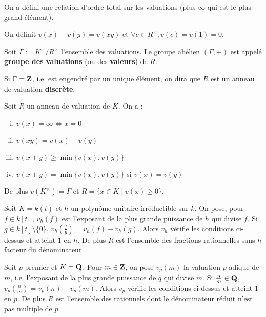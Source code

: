	\begin{rem}
		On a défini une relation d'ordre total sur les valuations (plus $\infty$ qui est le plus grand élément).
	\end{rem}

	\begin{note}
		On définit $v(x) + v(y) = v(xy)$ et $\forall c \in R^\times, v(c) = v(1) = 0$.
	\end{note}

	\begin{defn}
		Soit $\Gamma := K^\times / R^\times$ l'ensemble des valuations.
		Le groupe abélien $(\Gamma, +)$ est appelé \textbf{groupe des valuations} (ou des \textbf{valeurs}) de $R$.
	\end{defn}

	\begin{defn}
		Si $\Gamma = \mathbf{Z}$, i.e. est engendré par un unique élément, on dira que $R$ est un anneau de valuation \textbf{discrète}.
	\end{defn}

	\begin{pop}
		Soit $R$ un anneau de valuation de $K$. On a :
		\begin{enumerate}[(i)]
			\item $v(x) = \infty \iff x = 0$
			\item $v(xy) = v(x) + v(y)$
			\item $v(x + y) \geq \min \{ v(x), v(y) \}$
			\item $v(x + y) = \min \{ v(x), v(y) \}$ si $v(x) = v(y)$
		\end{enumerate}
		De plus $v(K^\times) = \Gamma$ et $R = \{ x \in K \mid v(x) \geq 0 \}$.
	\end{pop}

	\begin{ex}
		Soit $K = k(t)$ et $h$ un polynôme unitaire irréductible sur $k$.
		On pose, pour $f \in k[t]$, $v_h(f)$ est l'exposant de la plus grande puissance de $h$ qui divise $f$.
		Si $g \in k[t] \setminus \{ 0 \}$, $v_h \left( \frac{f}{g} \right) = v_h(f) - v_h(g)$.
		Alors $v_h$ vérifie les conditions ci-dessus et atteint $1$ en $h$.
		De plus $R$ est l'ensemble des fractions rationnelles sans $h$ facteur du dénominateur.
	\end{ex}

	\begin{ex}
		Soit $p$ premier et $K = \mathbf{Q}$.
		Pour $m \in \mathbf{Z}$, on pose $v_p(m)$ la valuation $p$-adique de $m$, i.e. l'exposant de la plus grande puissance de $q$ qui divise $m$.
		Si $\frac{n}{m} \in \mathbf{Q}$, $v_p \left( \frac{n}{m} \right) = v_p(n) - v_p(m)$.
		Alors $v_p$ vérifie les conditions ci-dessus et atteint $1$ en $p$.
		De plus $R$ est l'ensemble des rationnels dont le dénominateur réduit n'est pas multiple de $p$.
	\end{ex}

